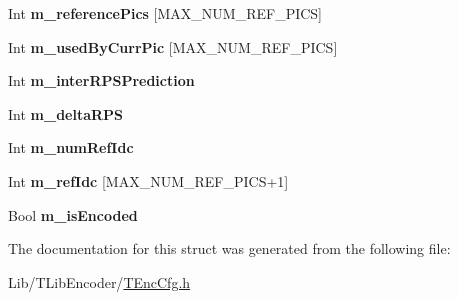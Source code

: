 \begin{DoxyCompactItemize}
Int {\bfseries m\+\_\+reference\+Pics} \mbox{[}M\+A\+X\+\_\+\+N\+U\+M\+\_\+\+R\+E\+F\+\_\+\+P\+I\+CS\mbox{]}
\item 
\mbox{\label{struct_g_o_p_entry_a4c11d80bed3aab0e7cd45637214f6a0e}} 
Int {\bfseries m\+\_\+used\+By\+Curr\+Pic} \mbox{[}M\+A\+X\+\_\+\+N\+U\+M\+\_\+\+R\+E\+F\+\_\+\+P\+I\+CS\mbox{]}
\item 
\mbox{\label{struct_g_o_p_entry_a86e2434cc7218a011365ac4edbdb2261}} 
Int {\bfseries m\+\_\+inter\+R\+P\+S\+Prediction}
\item 
\mbox{\label{struct_g_o_p_entry_ae1205e8365fa2ff0d444b3d9d60d9565}} 
Int {\bfseries m\+\_\+delta\+R\+PS}
\item 
\mbox{\label{struct_g_o_p_entry_a7fb2d245f2e3733c9b4d5f23f2c1bbf7}} 
Int {\bfseries m\+\_\+num\+Ref\+Idc}
\item 
\mbox{\label{struct_g_o_p_entry_ac69ebc8d74b04c654495c883b4a06206}} 
Int {\bfseries m\+\_\+ref\+Idc} \mbox{[}M\+A\+X\+\_\+\+N\+U\+M\+\_\+\+R\+E\+F\+\_\+\+P\+I\+CS+1\mbox{]}
\item 
\mbox{\label{struct_g_o_p_entry_a0cf4132767543a0d2043a7d0e50cb2a4}} 
Bool {\bfseries m\+\_\+is\+Encoded}
\end{DoxyCompactItemize}


The documentation for this struct was generated from the following file\+:\begin{DoxyCompactItemize}
\item 
Lib/\+T\+Lib\+Encoder/\hyperlink{_t_enc_cfg_8h}{T\+Enc\+Cfg.\+h}\end{DoxyCompactItemize}
